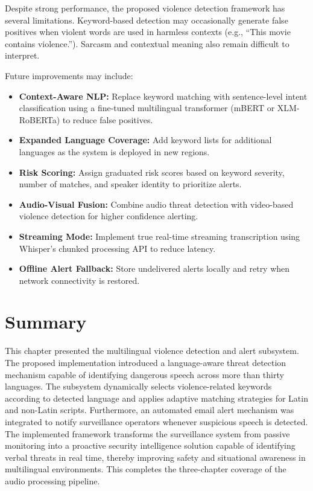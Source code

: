 \documentclass[12pt]{report}
\begin{document}
Despite strong performance, the proposed violence detection framework has several limitations. Keyword-based detection may occasionally generate false positives when violent words are used in harmless contexts (e.g., ``This movie contains violence.''). Sarcasm and contextual meaning also remain difficult to interpret.

Future improvements may include:
\begin{itemize}
    \item \textbf{Context-Aware NLP:} Replace keyword matching with sentence-level intent classification using a fine-tuned multilingual transformer (mBERT or XLM-RoBERTa) to reduce false positives.
    \item \textbf{Expanded Language Coverage:} Add keyword lists for additional languages as the system is deployed in new regions.
    \item \textbf{Risk Scoring:} Assign graduated risk scores based on keyword severity, number of matches, and speaker identity to prioritize alerts.
    \item \textbf{Audio-Visual Fusion:} Combine audio threat detection with video-based violence detection for higher confidence alerting.
    \item \textbf{Streaming Mode:} Implement true real-time streaming transcription using Whisper's chunked processing API to reduce latency.
    \item \textbf{Offline Alert Fallback:} Store undelivered alerts locally and retry when network connectivity is restored.
\end{itemize}

\section{Summary}

This chapter presented the multilingual violence detection and alert subsystem. The proposed implementation introduced a language-aware threat detection mechanism capable of identifying dangerous speech across more than thirty languages. The subsystem dynamically selects violence-related keywords according to detected language and applies adaptive matching strategies for Latin and non-Latin scripts. Furthermore, an automated email alert mechanism was integrated to notify surveillance operators whenever suspicious speech is detected. The implemented framework transforms the surveillance system from passive monitoring into a proactive security intelligence solution capable of identifying verbal threats in real time, thereby improving safety and situational awareness in multilingual environments. This completes the three-chapter coverage of the audio processing pipeline.
\end{document}
